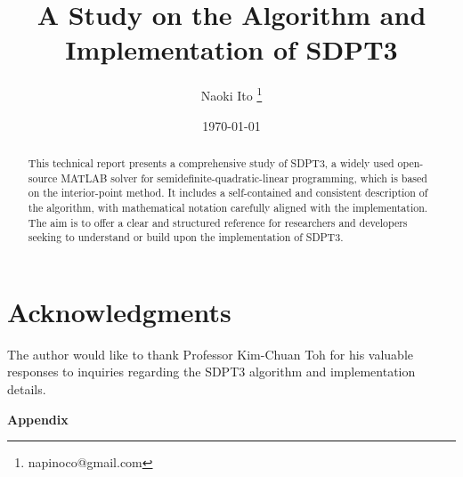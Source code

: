 \documentclass{scrartcl}
\title{A Study on the Algorithm and Implementation of SDPT3}
\author{
    Naoki Ito
    \thanks{napinoco@gmail.com}
}
\date{\today}
\begin{document}
\maketitle
\begin{abstract}
This technical report presents a comprehensive study of SDPT3, a widely used open-source MATLAB solver for semidefinite-quadratic-linear programming, which is based on the interior-point method.
It includes a self-contained and consistent description of the algorithm, with mathematical notation carefully aligned with the implementation.
The aim is to offer a clear and structured reference for researchers and developers seeking to understand or build upon the implementation of SDPT3.
\end{abstract}

\tableofcontents









\section*{Acknowledgments}
The author would like to thank Professor Kim-Chuan Toh for his valuable responses to inquiries
regarding the SDPT3 algorithm and implementation details.

\clearpage
{}
{}
\begin{center}
{\Large\bfseries\textsf{Appendix}}
\end{center}
\vspace{2em}

\appendix





\end{document}

